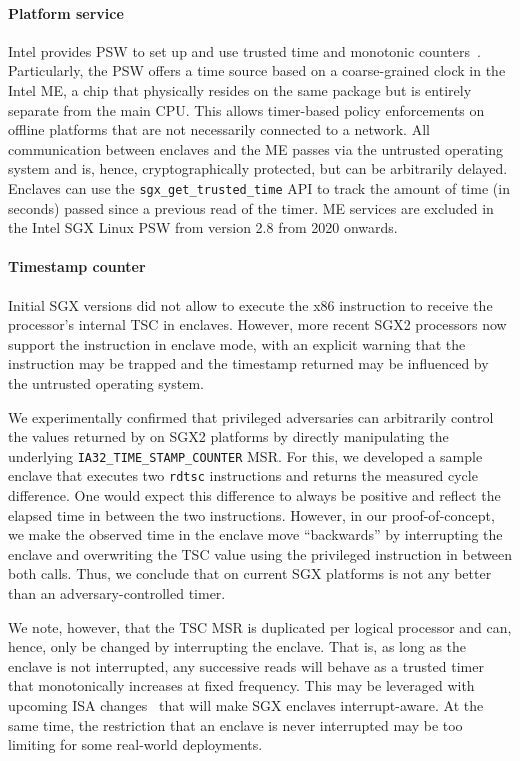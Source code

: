 \paragraph{Platform service}
Intel provides \ac{PSW} to set up and use trusted time and monotonic
counters~\cite{cen2017trusted}. Particularly, the PSW offers a \Ttwo{} time
source based on a coarse-grained clock in the Intel \ac{ME}, a chip that
physically resides on the same package but is entirely separate from the main
CPU. This allows timer-based policy enforcements on offline platforms that are
not necessarily connected to a network. All communication between enclaves and
the \ac{ME} passes via the untrusted operating system and is, hence,
cryptographically protected, but can be arbitrarily delayed. Enclaves can use
the \texttt{sgx\_get\_trusted\_time} API to track the amount of time (in
seconds) passed since a previous read of the timer. ME services are excluded in
the Intel SGX Linux PSW from version 2.8 from 2020 onwards.

\paragraph{Timestamp counter}
Initial SGX versions did not allow to execute the x86  instruction
to receive the processor's internal \ac{TSC} in enclaves. However, more recent
SGX2 processors now support the  instruction in enclave mode, with
an explicit warning that the instruction may be trapped and the timestamp
returned may be influenced by the untrusted operating system.

We experimentally confirmed that privileged adversaries can arbitrarily control
the values returned by  on SGX2 platforms by directly manipulating
the underlying \texttt{IA32\_TIME\_STAMP\_COUNTER} \ac{MSR}. For this, we
developed a sample enclave that executes two \texttt{rdtsc} instructions and
returns the measured cycle difference. One would expect this difference to
always be positive and reflect the elapsed time in between the two 
instructions. However, in our proof-of-concept, we make the observed time in the
enclave move ``backwards'' by interrupting the enclave and overwriting the
\ac{TSC} value using the privileged  instruction in between both
 calls. Thus, we conclude that  on current SGX platforms
is not any better than an adversary-controlled \Tzero{} timer.

We note, however, that the \ac{TSC} \ac{MSR} is duplicated per logical processor
and can, hence, only be changed by interrupting the enclave. That is, as long as
the enclave is not interrupted, any successive  reads will behave as
a trusted \Tfour{} timer that monotonically increases at fixed frequency. This
may be leveraged with upcoming ISA changes~\cite{intel2022aexnotify} that will
make SGX enclaves interrupt-aware. At the same time, the restriction that an
enclave is never interrupted may be too limiting for some real-world
deployments.

